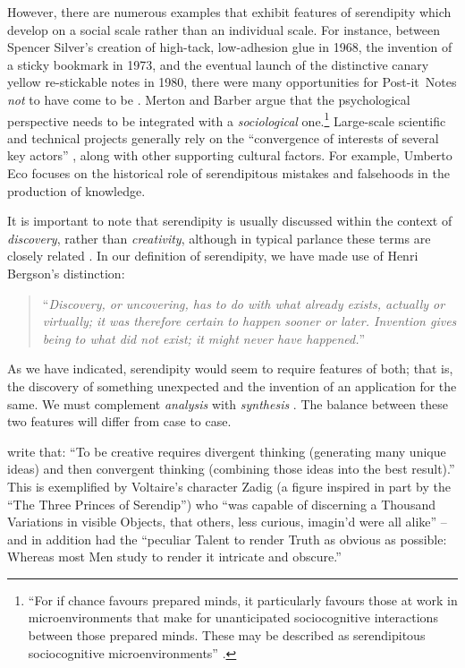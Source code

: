 However, there are numerous examples that exhibit features of
serendipity which develop on a social scale rather than an individual
scale.  For instance, between Spencer Silver's creation of high-tack,
low-adhesion glue in 1968, the invention of a sticky bookmark in 1973,
and the eventual launch of the distinctive canary yellow re-stickable
notes in 1980, there were many opportunities for
Post-it\texttrademark\ Notes \emph{not} to have come to be
\cite{tce-postits}.  Merton and Barber argue that the
psychological perspective needs to be integrated with a
\emph{sociological} one.\footnote{ ``For if chance favours prepared
  minds, it particularly favours those at work in microenvironments
  that make for unanticipated sociocognitive interactions between
  those prepared minds. These may be described as serendipitous
  sociocognitive microenvironments'' \cite[p. 259--260]{merton}.}
Large-scale scientific and technical projects generally rely on the
``convergence of interests of several key actors''
\cite{companions-in-geography}, along with other supporting cultural
factors.  For example, Umberto Eco \citeyear{eco2013serendipities} focuses on the
historical role of serendipitous mistakes and falsehoods in the
production of knowledge.

It is important to note that serendipity is usually discussed within
the context of \emph{discovery}, rather than \emph{creativity},
although in typical parlance these terms are closely related
\cite{jordanous12jims}.  In our definition of serendipity, we have
made use of Henri Bergson's distinction:
\begin{quote}
``\emph{Discovery, or uncovering, has to do with what already exists,
    actually or virtually; it was therefore certain to happen sooner
    or later.  Invention gives being to what did not exist; it might
    never have happened.}''~\cite{bergson2010creative}
\end{quote}
As we have indicated, serendipity would seem to require features of
both; that is, the discovery of something unexpected and the invention
of an application for the same.  We must complement \emph{analysis}
with \emph{synthesis} \cite{delanda1993virtual}.  The balance between
these two features will differ from case to case.

 write that: ``To be creative requires
divergent thinking (generating many unique ideas) and then convergent
thinking (combining those ideas into the best result).''  This is
exemplified by Voltaire's \citeyear{zadig} character Zadig (a figure inspired
in part by the ``The Three Princes of Serendip'') who ``was capable of
discerning a Thousand Variations in visible Objects, that others, less
curious, imagin’d were all alike'' -- and in addition had the
``peculiar Talent to render Truth as obvious as possible: Whereas most
Men study to render it intricate and obscure.''
